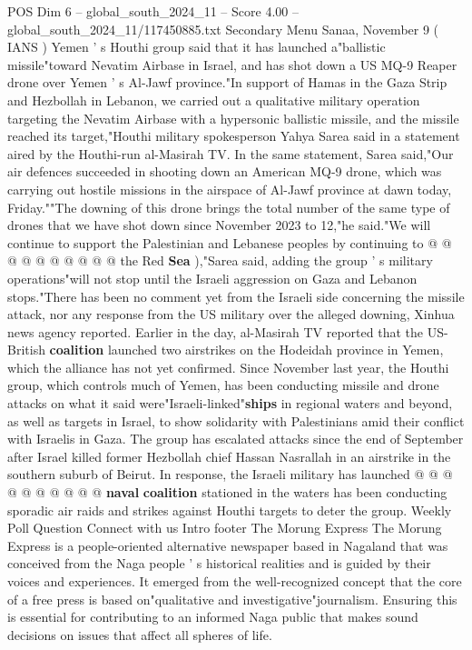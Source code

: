 \begin{textsample}{POS Dim 6 – global\_south\_2024\_11 – Score 4.00 – global\_south\_2024\_11/117450885.txt}  \label{ex:f6_pos_389}
Secondary Menu Sanaa, November 9 ( IANS ) Yemen ' s Houthi group said that it has launched a"ballistic missile"toward Nevatim Airbase in Israel, and has shot down a US MQ-9 Reaper drone over Yemen ' s Al-Jawf province."In support of Hamas in the Gaza Strip and Hezbollah in Lebanon, we carried out a qualitative military operation targeting the Nevatim Airbase with a hypersonic ballistic missile, and the missile reached its target,"Houthi military spokesperson Yahya Sarea said in a statement aired by the Houthi-run al-Masirah TV.
In the same statement, Sarea said,"Our air defences succeeded in shooting down an American MQ-9 drone, which was carrying out hostile missions in the airspace of Al-Jawf province at dawn today, Friday.""The downing of this drone brings the total number of the same type of drones that we have shot down since November 2023 to 12,"he said."We will continue to support the Palestinian and Lebanese peoples by continuing to @ @ @ @ @ @ @ @ @ @ the Red \textbf{Sea} ),"Sarea said, adding the group ' s military operations"will not stop until the Israeli aggression on Gaza and Lebanon stops."There has been no comment yet from the Israeli side concerning the missile attack, nor any response from the US military over the alleged downing, Xinhua news agency reported.
Earlier in the day, al-Masirah TV reported that the US-British \textbf{coalition} launched two airstrikes on the Hodeidah province in Yemen, which the alliance has not yet confirmed.
Since November last year, the Houthi group, which controls much of Yemen, has been conducting missile and drone attacks on what it said were"Israeli-linked"\textbf{ships} in regional waters and beyond, as well as targets in Israel, to show solidarity with Palestinians amid their conflict with Israelis in Gaza.
The group has escalated attacks since the end of September after Israel killed former Hezbollah chief Hassan Nasrallah in an airstrike in the southern suburb of Beirut.
In response, the Israeli military has launched @ @ @ @ @ @ @ @ @ @ \textbf{naval} \textbf{coalition} stationed in the waters has been conducting sporadic air raids and strikes against Houthi targets to deter the group.
Weekly Poll Question Connect with us Intro footer The Morung Express The Morung Express is a people-oriented alternative newspaper based in Nagaland that was conceived from the Naga people ' s historical realities and is guided by their voices and experiences.
It emerged from the well-recognized concept that the core of a free press is based on"qualitative and investigative"journalism.
Ensuring this is essential for contributing to an informed Naga public that makes sound decisions on issues that affect all spheres of life.

\end{textsample}
